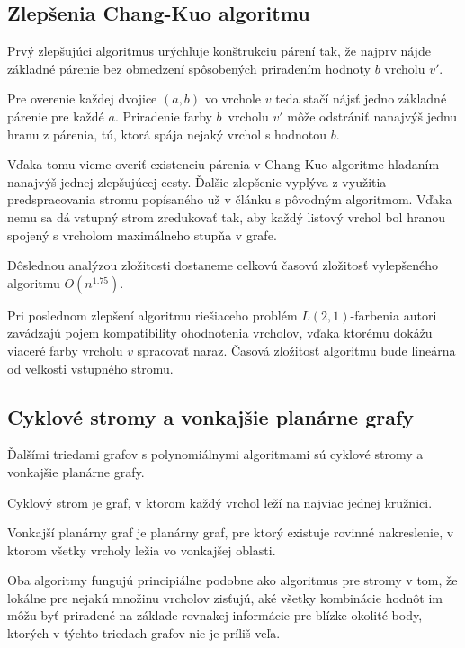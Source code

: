 \subsection{Zlepšenia Chang-Kuo algoritmu}

Prvý zlepšujúci algoritmus urýchľuje konštrukciu
párení tak, že najprv nájde základné párenie bez obmedzení spôsobených priradením hodnoty $b$
vrcholu $v'$.

Pre overenie každej dvojice $(a,b)$ vo vrchole $v$ teda stačí nájsť jedno základné
párenie pre každé $a$. Priradenie farby $b$ vrcholu $v'$ môže odstrániť nanajvýš jednu hranu z párenia,
tú, ktorá spája nejaký vrchol s hodnotou $b$. 

Vďaka tomu vieme overiť existenciu párenia v Chang-Kuo algoritme hľadaním nanajvýš
jednej zlepšujúcej cesty. Ďalšie zlepšenie vyplýva z využitia predspracovania stromu popísaného
už v článku s pôvodným algoritmom. Vďaka nemu sa dá vstupný strom zredukovať tak, aby každý
listový vrchol bol hranou spojený s vrcholom maximálneho stupňa v grafe\cite{chang_kuo}.

Dôslednou analýzou 
zložitosti dostaneme celkovú časovú zložitosť vylepšeného algoritmu $O(n^{1.75})$\cite{chang_kuo_improv}.

Pri poslednom zlepšení algoritmu riešiaceho problém $L(2,1)$-farbenia autori zavádzajú
pojem kompatibility ohodnotenia vrcholov, vďaka ktorému dokážu viaceré farby vrcholu $v$
spracovať naraz. Časová zložitosť algoritmu bude lineárna od veľkosti vstupného stromu\cite{chang_kuo_linear}.

\subsection{Cyklové stromy a vonkajšie planárne grafy}

Ďalšími triedami grafov s polynomiálnymi algoritmami sú cyklové stromy\cite{kaktusy} a vonkajšie
planárne grafy\cite{outer_planar}.

\begin{defn}
    Cyklový strom je graf, v ktorom každý vrchol leží na najviac jednej kružnici.
\end{defn}

\begin{defn}
    Vonkajší planárny graf je planárny graf, pre ktorý existuje rovinné nakreslenie, v ktorom
    všetky vrcholy ležia vo vonkajšej oblasti.
\end{defn}

Oba algoritmy fungujú principiálne podobne ako algoritmus pre stromy v tom, že lokálne pre
nejakú množinu vrcholov zisťujú, aké všetky kombinácie hodnôt im môžu byť priradené na
základe rovnakej informácie pre blízke okolité body, ktorých v týchto triedach grafov nie je
príliš veľa.


